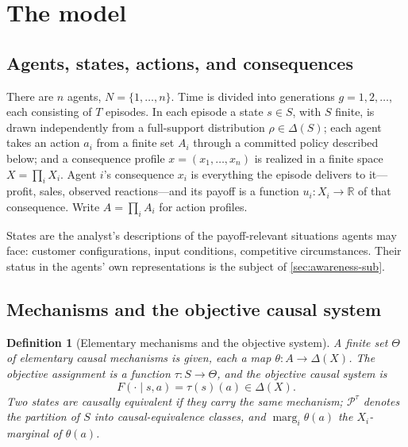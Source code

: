 \documentclass[11pt]{article}
\newtheorem{definition}[assumption]{Definition}
\theoremstyle{definition}
\newcommand{\marg}[1]{\operatorname{marg}_{#1}}
\begin{document}
\section{The model}
\label{sec:model}

\subsection{Agents, states, actions, and consequences}
\label{sec:primitives}

There are $n$ agents, $N=\{1,\dots,n\}$.  Time is divided into generations
$g=1,2,\dots$, each consisting of $T$ episodes.  In each episode a state
$s\in S$, with $S$ finite, is drawn independently from a full-support
distribution $\rho\in\Delta(S)$; each agent takes an action $a_i$ from a
finite set $A_i$ through a committed policy described below; and a
consequence profile $x=(x_1,\dots,x_n)$ is realized in a finite space
$X=\prod_iX_i$.  Agent $i$'s consequence $x_i$ is everything the episode
delivers to it---profit, sales, observed reactions---and its payoff is a
function $u_i:X_i\to\mathbb R$ of that consequence.  Write $A=\prod_iA_i$ for
action profiles.

States are the analyst's descriptions of the payoff-relevant situations
agents may face: customer configurations, input conditions, competitive
circumstances.  Their status in the agents' own representations is the
subject of \cref{sec:awareness-sub}.

\subsection{Mechanisms and the objective causal system}
\label{sec:mechanisms-sub}

\begin{definition}[Elementary mechanisms and the objective system]
\label{def:mechanisms}
A finite set $\Theta$ of \emph{elementary causal mechanisms} is given, each a
map $\theta:A\to\Delta(X)$.  The \emph{objective assignment} is a function
$\tau:S\to\Theta$, and the \emph{objective causal system} is
\begin{equation}
F(\cdot\mid s,a)=\tau(s)(a)\in\Delta(X).
\label{eq:objective-system}
\end{equation}
Two states are \emph{causally equivalent} if they carry the same mechanism;
$\mathcal P^{\tau}$ denotes the partition of $S$ into causal-equivalence
classes, and $\marg{i}\theta(a)$ the $X_i$-marginal of $\theta(a)$.
\end{definition}
\end{document}
